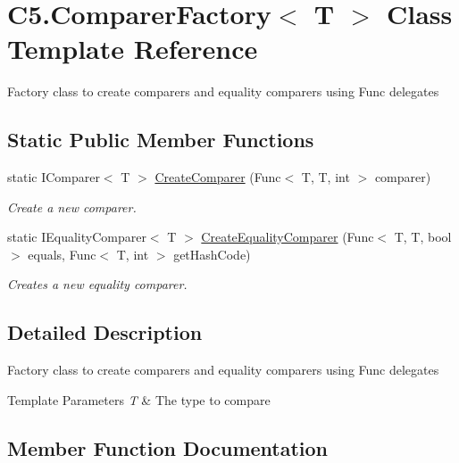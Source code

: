 \hypertarget{class_c5_1_1_comparer_factory}{}\section{C5.\+Comparer\+Factory$<$ T $>$ Class Template Reference}
\label{class_c5_1_1_comparer_factory}


Factory class to create comparers and equality comparers using Func delegates  


\subsection*{Static Public Member Functions}
\begin{DoxyCompactItemize}
\item 
static I\+Comparer$<$ T $>$ \hyperlink{class_c5_1_1_comparer_factory_a1eaf53bcc728bdc832caea1aa1449085}{Create\+Comparer} (Func$<$ T, T, int $>$ comparer)
\begin{DoxyCompactList}\small\item\em Create a new comparer. \end{DoxyCompactList}\item 
static I\+Equality\+Comparer$<$ T $>$ \hyperlink{class_c5_1_1_comparer_factory_ab4ee0fde20dd001ed045a6472963fccf}{Create\+Equality\+Comparer} (Func$<$ T, T, bool $>$ equals, Func$<$ T, int $>$ get\+Hash\+Code)
\begin{DoxyCompactList}\small\item\em Creates a new equality comparer. \end{DoxyCompactList}\end{DoxyCompactItemize}


\subsection{Detailed Description}
Factory class to create comparers and equality comparers using Func delegates 


\begin{DoxyTemplParams}{Template Parameters}
{\em T} & The type to compare\\
\hline
\end{DoxyTemplParams}


\subsection{Member Function Documentation}
\hypertarget{class_c5_1_1_comparer_factory_a1eaf53bcc728bdc832caea1aa1449085}{}
